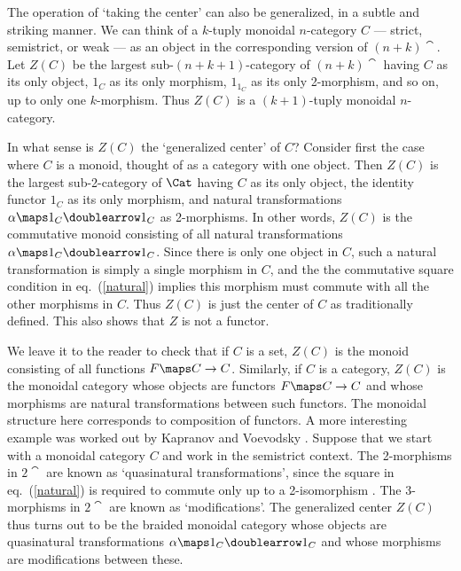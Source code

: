 The operation of `taking the center' can also be generalized, in
a subtle and striking manner.  We can think of a $k$-tuply
monoidal $n$-category $C$ --- strict, semistrict, or weak --- as
an object in the corresponding version of $(n+k)\cat$.  Let
$Z(C)$ be the largest sub-$(n+k+1)$-category of $(n+k)\cat$
having $C$ as its only object, $1_C$ as its only morphism,
$1_{1_C}$ as its only 2-morphism, and so on, up to only one
$k$-morphism.  Thus $Z(C)$ is a $(k+1)$-tuply monoidal
$n$-category.

In what sense is $Z(C)$ the `generalized center' of $C$?
Consider first the case where $C$ is a monoid, thought of as a
category with one object.  Then $Z(C)$ is the largest
sub-2-category of $\Cat$ having $C$ as its only object, the
identity functor $1_C$ as its only morphism, and natural
transformations $\alpha\maps 1_C \doublearrow 1_C$ as 2-morphisms.  In
other words, $Z(C)$ is the commutative monoid consisting of all
natural transformations $\alpha \maps 1_C \doublearrow 1_C$.   Since
there is only one object in $C$, such a natural transformation is
simply a single morphism in $C$, and the the commutative square
condition in eq.\ (\ref{natural}) implies this morphism must
commute with all the other morphisms in $C$.  Thus $Z(C)$ is just
the center of $C$ as traditionally defined.  This also shows that
$Z$ is not a functor.

We leave it to the reader to check that if $C$ is a set, $Z(C)$
is the monoid consisting of all functions $F \maps C \to C$.
Similarly, if $C$ is a category, $Z(C)$ is the monoidal category
whose objects are functors $F \maps C \to C$ and whose morphisms
are natural transformations between such functors.  The monoidal
structure here corresponds to composition of functors.   A more
interesting example was worked out by Kapranov and Voevodsky
\cite{KV}.   Suppose that we start with a monoidal category $C$
and work in the semistrict context.    The 2-morphisms in $2\cat$
are known as `quasinatural transformations', since the square in
eq.\ (\ref{natural})  is required to commute only up to a
2-isomorphism \cite{Gray}. The 3-morphisms in $2\cat$ are known
as `modifications'.  The generalized center $Z(C)$ thus turns out
to be the braided monoidal category whose objects are
quasinatural transformations $\alpha \maps 1_C \doublearrow 1_C$
and whose morphisms are modifications between these.

